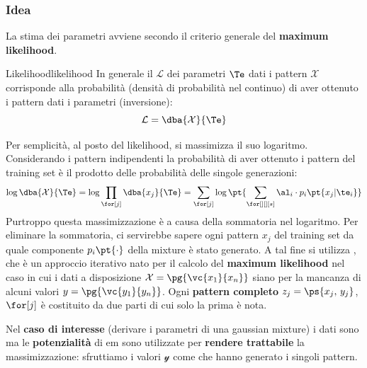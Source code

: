 \subsubsection{Idea}\label{sec:idea} %
La stima dei parametri avviene secondo il criterio generale del \textbf{maximum likelihood}.
\begin{definition}{Likelihood}{likelihood}
    In generale il  $\mathcal{L}$ dei parametri $\Te$ dati i pattern $\mathcal{X}$ corrisponde alla probabilità (densità di probabilità nel continuo) di aver ottenuto i pattern dati i parametri (inversione):
    \[
        \mathcal{L} = \dba{\mathcal X}{\Te}
    \]
\end{definition}
Per semplicità, al posto del likelihood, si massimizza il suo logaritmo.
Considerando i pattern indipendenti la probabilità di aver ottenuto i pattern del training set è il prodotto delle probabilità delle singole generazioni:
\[
    \log{\dba{\mathcal X}{\Te}} = \log{\prod_{\for[j]}{\dba{x_j}{\Te}}} = \sum_{\for[j]}{\log{\pt{\sum_{\for[][][s]}{\al_i \cdot p_i\pt{x_j|\te_i}}}}}
\]
Purtroppo questa massimizzazione è  a causa della sommatoria nel logaritmo.
Per eliminare la sommatoria, ci servirebbe sapere ogni pattern $x_j$ del training set da quale componente $p_i\pt{\cdot}$ della mixture è stato generato.
\emptyln{}
A tal fine si utilizza , che è un approccio iterativo nato per il calcolo del \textbf{maximum likelihood} nel caso in cui i dati a disposizione $\mathcal X = \pg{\vc{x_1}{x_n}}$ siano  per la mancanza di alcuni valori $y = \pg{\vc{y_1}{y_n}}$.
Ogni \textbf{pattern completo} $z_j = \ps{x_j,\,y_j}$, $\for[j]$ è costituito da due parti di cui solo la prima è nota.
\begin{note}
    Nel \textbf{caso di interesse} (derivare i parametri di una gaussian mixture) i dati sono  ma le \textbf{potenzialità} di \ac{em} sono utilizzate per \textbf{rendere trattabile} la massimizzazione: sfruttiamo i valori $\mathcal y$ come  che hanno generato i singoli pattern.
\end{note}
%
